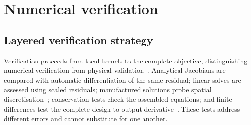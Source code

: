 \section{Numerical verification}\label{sec:verification}
\subsection{Layered verification strategy}
Verification proceeds from local kernels to the complete objective,
distinguishing numerical verification from physical
validation~\cite{oberkampf2002}.
Analytical Jacobians are compared with automatic differentiation of the
same residual; linear solves are assessed using scaled residuals;
manufactured solutions probe spatial discretisation~\cite{salari2000}; conservation tests
check the assembled equations; and finite differences test the complete
design-to-output derivative~\cite{dolfinverification}. These tests address different errors and
cannot substitute for one another.

